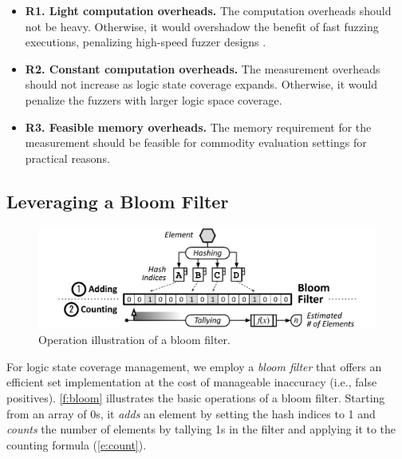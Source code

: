 \documentclass[letterpaper,twocolumn,10pt]{article}
\begin{document}
\begin{itemize}

  \item \textbf{R1. Light computation overheads.}
    The computation overheads should not be heavy. Otherwise, it would overshadow
    the benefit of fast fuzzing executions, penalizing high-speed fuzzer designs
    \cite{sergej2021nyx,schumilo2020hypercube,song2020agamotto}.

  \item \textbf{R2. Constant computation overheads.}
    The measurement overheads should not increase as logic state coverage
    expands. Otherwise, it would penalize the fuzzers with larger logic space
    coverage.

  \item \textbf{R3. Feasible memory overheads.}
    The memory requirement for the measurement should be feasible for commodity
    evaluation settings for practical reasons.
\end{itemize}


\subsection{Leveraging a Bloom Filter}
\label{s:measure:bloom}

\begin{figure}[t]
  \centering
  \includegraphics[width=\columnwidth]{images/bloom.pdf}
  \caption{Operation illustration of a bloom filter.}
  \label{f:bloom}
\end{figure}


For logic state coverage management, we employ a \emph{bloom filter} that 
offers an %
efficient set implementation at the cost of manageable inaccuracy (i.e., false
positives).
%
%
\autoref{f:bloom} illustrates the basic operations of a bloom filter. Starting
from an array of 0s, it \emph{adds} an element by setting the hash indices to 1
and \emph{counts} the number of elements by tallying 1s in the filter and
applying it to the counting formula (\autoref{e:count}).
\end{document}
